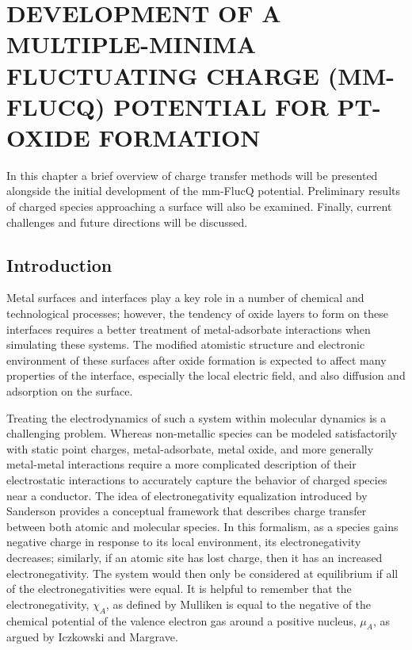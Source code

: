 
\chapter{DEVELOPMENT OF A MULTIPLE-MINIMA FLUCTUATING CHARGE (MM-FLUCQ) POTENTIAL FOR PT-OXIDE FORMATION}
\label{chap:mmFlucQ}


In this chapter a brief overview of charge transfer methods will be presented
alongside the initial development of the mm-FlucQ potential.  Preliminary
results of charged species approaching a  surface will also be
examined. Finally, current challenges and future directions will be discussed.


\section{Introduction}
Metal surfaces and interfaces play a key role in a number of chemical and
technological processes; however, the tendency of oxide layers to form on these
interfaces requires a better treatment of metal-adsorbate interactions when
simulating these systems\citep{Streitz:1994mw, Duin:2010dk, Devine:2011bk,
Fantauzzi:2014pb}.  The modified atomistic structure and electronic environment
of these surfaces after oxide formation is expected to affect many properties
of the interface, especially the local electric field, and also diffusion and
adsorption on the surface.\citep{Streitz:1994mw, Getman:2008sp,
Bray:2011hq,Small:2012dw}

Treating the electrodynamics of such a system within molecular dynamics is a
challenging problem. Whereas non-metallic species can be modeled satisfactorily
with static point charges, metal-adsorbate, metal oxide, and more generally
metal-metal interactions require a more complicated description of their
electrostatic interactions to accurately capture the behavior of charged
species near a conductor. The idea of electronegativity equalization introduced
by Sanderson\citep{Sanderson:1951mz} provides a conceptual framework that
describes charge transfer between both atomic and molecular species. In this
formalism, as a species gains negative charge in response to its local
environment, its electronegativity decreases; similarly, if an atomic site has
lost charge, then it has an increased electronegativity. The system would then
only be considered at equilibrium if all of the electronegativities were equal.
It is helpful to remember that the electronegativity, $\chi_A$, as defined by
Mulliken\citep{Mulliken:1934wt} is equal to the negative of the chemical
potential of the valence electron gas around a positive nucleus, $\mu_A$, as
argued by Iczkowski and Margrave\citep{Iczkowski:1961wq}.

